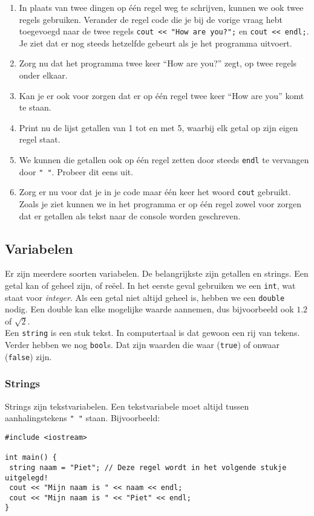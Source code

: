 \documentclass[12pt,a4paper]{article}
\newcommand{\icode}{\lstinline}
\begin{document}
\begin{enumerate}
		\item
			In plaats van twee dingen op \'e\'en regel weg te schrijven, kunnen we ook twee regels gebruiken. Verander de regel code die je bij de vorige vraag hebt toegevoegd naar de twee regels \icode{cout << "How are you?";} en \icode{cout << endl;}. Je ziet dat er nog steeds hetzelfde gebeurt als je het programma uitvoert.
		\item
			Zorg nu dat het programma twee keer ``How are you?'' zegt, op twee regels onder elkaar.
		\item
			Kan je er ook voor zorgen dat er op \'e\'en regel twee keer ``How are you'' komt te staan.
		\item
			Print nu de lijst getallen van 1 tot en met 5, waarbij elk getal op zijn eigen regel staat.
		\item
			We kunnen die getallen ook op \'e\'en regel zetten door steeds \icode{endl} te vervangen door \icode{" "}. Probeer dit eens uit.
		\item
			Zorg er nu voor dat je in je code maar \'e\'en keer het woord \icode{cout} gebruikt.
			Zoals je ziet kunnen we in het programma er op \'e\'en regel zowel voor zorgen dat er getallen als tekst naar de console worden geschreven. 
\end{enumerate}

\subsection{Variabelen}
Er zijn meerdere soorten variabelen. De belangrijkste zijn getallen en strings. Een getal kan of geheel zijn, of re\"eel. In het eerste geval gebruiken we een \icode{int}, wat staat voor \emph{integer}. Als een getal niet altijd geheel is, hebben we een \icode{double} nodig. Een double kan elke mogelijke waarde aannemen, dus bijvoorbeeld ook $1.2$ of $\sqrt 2$.\\
Een \icode{string} is een stuk tekst. In computertaal is dat gewoon een rij van tekens. Verder hebben we nog \icode{bool}s. Dat zijn waarden die waar (\icode{true}) of onwaar (\icode{false}) zijn.

\subsubsection{Strings}

Strings zijn tekstvariabelen. Een tekstvariabele moet altijd tussen aanhalingstekens \icode{" "} staan. 
Bijvoorbeeld: 

\begin{lstlisting}
#include <iostream> 

int main() {
 string naam = "Piet"; // Deze regel wordt in het volgende stukje uitgelegd! 
 cout << "Mijn naam is " << naam << endl;
 cout << "Mijn naam is " << "Piet" << endl; 
}
\end{lstlisting}
\end{document}
